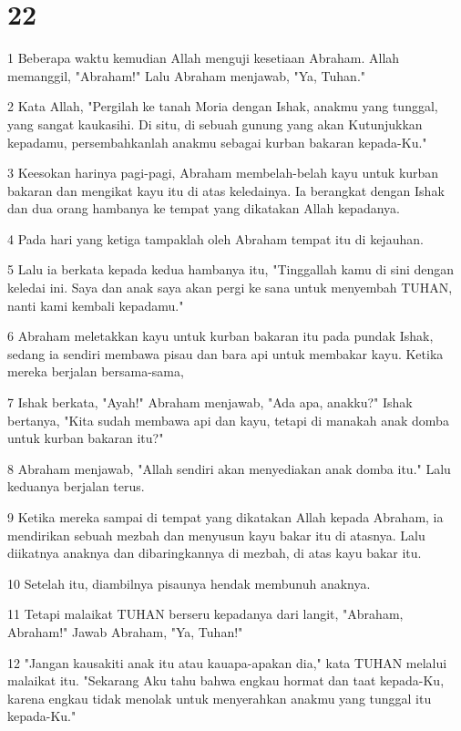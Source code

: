 \chapter{22}

\par 1 Beberapa waktu kemudian Allah menguji kesetiaan Abraham. Allah memanggil, "Abraham!" Lalu Abraham menjawab, "Ya, Tuhan."
\par 2 Kata Allah, "Pergilah ke tanah Moria dengan Ishak, anakmu yang tunggal, yang sangat kaukasihi. Di situ, di sebuah gunung yang akan Kutunjukkan kepadamu, persembahkanlah anakmu sebagai kurban bakaran kepada-Ku."
\par 3 Keesokan harinya pagi-pagi, Abraham membelah-belah kayu untuk kurban bakaran dan mengikat kayu itu di atas keledainya. Ia berangkat dengan Ishak dan dua orang hambanya ke tempat yang dikatakan Allah kepadanya.
\par 4 Pada hari yang ketiga tampaklah oleh Abraham tempat itu di kejauhan.
\par 5 Lalu ia berkata kepada kedua hambanya itu, "Tinggallah kamu di sini dengan keledai ini. Saya dan anak saya akan pergi ke sana untuk menyembah TUHAN, nanti kami kembali kepadamu."
\par 6 Abraham meletakkan kayu untuk kurban bakaran itu pada pundak Ishak, sedang ia sendiri membawa pisau dan bara api untuk membakar kayu. Ketika mereka berjalan bersama-sama,
\par 7 Ishak berkata, "Ayah!" Abraham menjawab, "Ada apa, anakku?" Ishak bertanya, "Kita sudah membawa api dan kayu, tetapi di manakah anak domba untuk kurban bakaran itu?"
\par 8 Abraham menjawab, "Allah sendiri akan menyediakan anak domba itu." Lalu keduanya berjalan terus.
\par 9 Ketika mereka sampai di tempat yang dikatakan Allah kepada Abraham, ia mendirikan sebuah mezbah dan menyusun kayu bakar itu di atasnya. Lalu diikatnya anaknya dan dibaringkannya di mezbah, di atas kayu bakar itu.
\par 10 Setelah itu, diambilnya pisaunya hendak membunuh anaknya.
\par 11 Tetapi malaikat TUHAN berseru kepadanya dari langit, "Abraham, Abraham!" Jawab Abraham, "Ya, Tuhan!"
\par 12 "Jangan kausakiti anak itu atau kauapa-apakan dia," kata TUHAN melalui malaikat itu. "Sekarang Aku tahu bahwa engkau hormat dan taat kepada-Ku, karena engkau tidak menolak untuk menyerahkan anakmu yang tunggal itu kepada-Ku."
